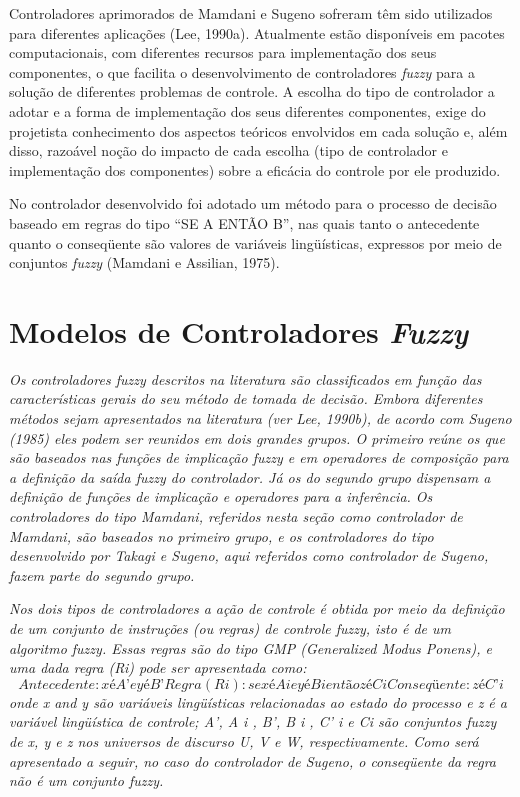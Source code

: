 \documentclass[
	twoside,				%
	twocolumn,				%
	english,				%
	brazil,					%
]{article}
\begin{document}
Controladores aprimorados de Mamdani e Sugeno sofreram têm sido utilizados para diferentes aplicações (Lee, 1990a). Atualmente estão disponíveis em pacotes computacionais, com diferentes recursos para implementação dos seus componentes, o que facilita o desenvolvimento de controladores \textit{fuzzy} para a solução de diferentes problemas de controle. A escolha do tipo de controlador a adotar e a forma de implementação dos seus diferentes componentes, exige do projetista conhecimento dos aspectos teóricos envolvidos em cada solução e, além disso, razoável noção do impacto de cada escolha (tipo de controlador e implementação dos componentes) sobre a eficácia do controle por ele produzido.

No controlador desenvolvido foi adotado um método para o processo de decisão baseado em regras do tipo “SE A ENTÃO B”, nas quais tanto o antecedente quanto o conseqüente são valores de variáveis lingüísticas, expressos por meio de conjuntos \textit{fuzzy} (Mamdani e Assilian, 1975). 


\section{Modelos de Controladores \textit{Fuzzy}}

\textit{Os controladores fuzzy descritos na literatura são classificados em função das características gerais do seu método de tomada de decisão. Embora diferentes métodos sejam apresentados na literatura (ver Lee, 1990b), de acordo com Sugeno (1985) eles podem ser reunidos em dois grandes grupos. O primeiro reúne os que são baseados nas funções de implicação fuzzy e em operadores de composição para a definição da saída fuzzy do controlador. Já os do segundo grupo dispensam a definição de funções de implicação e operadores para a inferência. Os controladores do tipo Mamdani, referidos nesta seção como controlador de Mamdani, são baseados no primeiro grupo, e os controladores do tipo desenvolvido por Takagi e Sugeno, aqui referidos como controlador de Sugeno, fazem parte do segundo grupo.}

\textit{Nos dois tipos de controladores a ação de controle é obtida por meio da definição de um conjunto de instruções (ou regras) de controle fuzzy, isto é de um algoritmo fuzzy. Essas regras são do tipo GMP (\textit{Generalized Modus Ponens}), e uma dada regra (Ri) pode ser apresentada como:}
$$
Antecedente: x é A’ e y é B’ 
Regra (R i ): se x é A i e y é B i então z é C i 
Conseqüente: z é C’ i 
$$
\textit{onde x and y são variáveis lingüísticas relacionadas ao estado do processo e z é a variável lingüística de controle; A’, A i , B’, B i , C’ i e Ci são conjuntos \textit{fuzzy} de x, y e z nos universos de discurso U, V e W, respectivamente. Como será apresentado a seguir, no caso do controlador de Sugeno, o conseqüente da regra não é um conjunto \textit{fuzzy}.}
\end{document}
